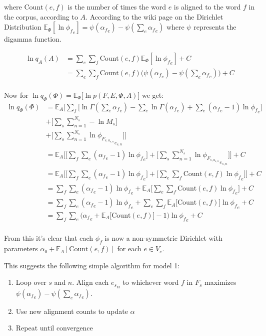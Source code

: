 \documentclass[11pt]{article}
\begin{document}
where $\text{Count}(e, f)$ is the number of times the word $e$ is aligned to the word $f$ in the corpus, according to $A$.
According to the wiki page on the Dirichlet Distribution $\mathbb{E}_\Phi [\ln {\phi_f}_e] = \psi({\alpha_f}_e) - \psi(\sum_e {\alpha_f}_e)$ where $\psi$ represents the digamma function.

\begin{align*}
\ln q_A(A) &= \sum_e \sum_f \text{Count}(e, f) \mathbb{E}_\Phi [\ln {\phi_f}_e] + C \\
&= \sum_e \sum_f \text{Count}(e, f) \big(\psi({\alpha_f}_e) - \psi(\sum_e {\alpha_f}_e)\big) + C \\
\end{align*}

Now for $\ln q_\Phi(\Phi) = \mathbb{E}_\Phi \big[ \ln p(F, E, \Phi, A) \big]$ we get:
\begin{align*}
\ln q_\Phi(\Phi) &= \mathbb{E}_A \bigg[ \sum_f \big[ \ln \Gamma(\sum_e {\alpha_f}_e) - \sum_e \ln \Gamma({\alpha_f}_e) + \sum_e ({\alpha_f}_e - 1) \ln {\phi_f}_e \big] \\
&+ \big[\sum_s \sum_{n=1}^{N_s} -\ln M_s \big]\\
&+ \big[ \sum_s \sum_{n=1}^{N_s} \ln {\phi_{F_{s, a_{s, n}}}}_{e_{s,n}} \big] \bigg] \\
&= \mathbb{E}_A \bigg[ \big[ \sum_f \sum_e ({\alpha_f}_e - 1) \ln {\phi_f}_e \big] + \big[ \sum_s \sum_{n=1}^{N_s} \ln {\phi_{F_{s, a_{s, n}}}}_{e_{s,n}} \big] \bigg] + C \\
&= \mathbb{E}_A \bigg[ \big[ \sum_f \sum_e ({\alpha_f}_e - 1) \ln {\phi_f}_e \big] + \big[ \sum_e \sum_f \text{Count}(e, f) \ln {\phi_f}_e \big] \bigg] + C \\
&= \sum_f \sum_e ({\alpha_f}_e - 1) \ln {\phi_f}_e + \mathbb{E}_A \bigg[ \sum_e \sum_f \text{Count}(e, f) \ln {\phi_f}_e \bigg] + C \\
&= \sum_f \sum_e ({\alpha_f}_e - 1) \ln {\phi_f}_e + \sum_e \sum_f \mathbb{E}_A\big[\text{Count}(e, f)\big] \ln {\phi_f}_e + C \\
&= \sum_f \sum_e \bigg({\alpha_f}_e + \mathbb{E}_A\big[\text{Count}(e, f)\big] - 1\bigg) \ln {\phi_f}_e + C \\
\end{align*}

From this it's clear that each $\phi_f$ is now a non-symmetric Dirichlet with parameters $\alpha_0 + \mathbb{E}_A[\text{Count}(e, f)]$ for each $e \in V_e$.

This suggests the following simple algorithm for model 1:

\begin{enumerate}
\item Loop over $s$ and $n$. Align each ${e_s}_n$ to whichever word $f$ in $F_s$ maximizes $\psi({\alpha_f}_e) - \psi(\sum_e {\alpha_f}_e)$.
\item Use new alignment counts to update $\alpha$
\item Repeat until convergence 
\end{enumerate}
\end{document}

